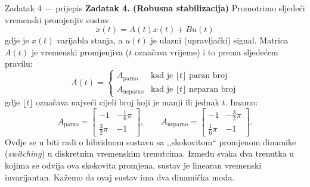 \begin{zadatak}{Zadatak 4 --- prijepis}
\textbf{Zadatak 4. (Robusna stabilizacija)} Promotrimo sljedeći vremenski
promjenjiv sustav
\begin{equation}
\dot{x}(t) = A(t)x(t) + Bu(t) \tag{3}
\end{equation}
gdje je $x(t)$ varijabla stanja, a $u(t)$ je ulazni (upravljački) signal. Matrica
$A(t)$ je vremenski promjenjiva ($t$ označava vrijeme) i to prema sljedećem
pravilu:
\begin{equation}
A(t) = \begin{cases}
A_{\mathrm{parno}} & \text{kad je } \lfloor t \rfloor \text{ paran broj} \\
A_{\mathrm{neparno}} & \text{kad je } \lfloor t \rfloor \text{ neparan broj}
\end{cases} \tag{4}
\end{equation}
gdje $\lfloor t \rfloor$ označava najveći cijeli broj koji je manji ili jednak
$t$. Imamo:
\begin{equation}
A_{\mathrm{parno}} = \begin{bmatrix} -1 & -\tfrac{1}{6}\pi \\ \tfrac{3}{2}\pi & -1 \end{bmatrix},
\qquad
A_{\mathrm{neparno}} = \begin{bmatrix} -1 & -\tfrac{3}{2}\pi \\ \tfrac{1}{6}\pi & -1 \end{bmatrix}. \tag{5}
\end{equation}
Ovdje se u biti radi o hibridnom sustavu sa ,,skokovitom`` promjenom dinamike
(\emph{switching}) u diskretnim vremenskim trenutcima. Između svaka dva trenutka
u kojima se odvija ova skokovita promjena, sustav je linearan vremenski
invarijantan. Kažemo da ovaj sustav ima dva dinamička moda.


\end{zadatak}
